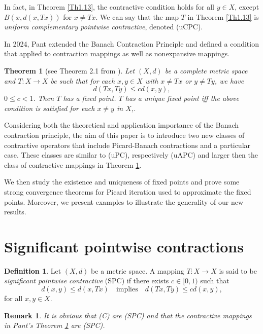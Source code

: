\documentclass[12 pt]{article}
\theoremstyle{lema}
\theoremstyle{proposition}
\theoremstyle{theorem}
\newtheorem{theorem}{Theorem}[section]
\theoremstyle{theorem}
\newtheorem{remark}{Remark}[section]
\theoremstyle{corollary}
\theoremstyle{definition}
\newtheorem{definition}{Definition}[section]
\theoremstyle{example}
\begin{document}
	In fact, in Theorem \ref{Th1.13}, the contractive condition holds for all $y \in X$, except $B(x, d(x,Tx))$ for $x \neq Tx$. We can say that the map $T$ in Theorem \ref{Th1.13} is \textit{uniform complementary pointwise contractive}, denoted (uCPC).
	
	In 2024, Pant \cite{Pant} extended the Banach Contraction Principle and defined a condition that applied to contraction mappings as well as nonexpansive mappings.
	
	\begin{theorem}[see Theorem 2.1 from \cite{Pant}]
		Let \((X,d)\) be a complete metric space and \(T : X \to X \) be such that for each \(x,y \in X\) with \(x \neq Tx\) or $y \neq Ty$, we have \[d(Tx,Ty) \leq c d(x,y),\] \(0\leq c <1\). Then \(T\) has a fixed point. \(T\) has a unique fixed point iff the above condition is satisfied for each $x \neq y$ in $X$,.
	\label{Th1.14}
	\end{theorem}

	Considering both the theoretical and application importance of the Banach contraction principle, the aim of this paper is to introduce two new classes of contractive operators that include Picard-Banach contractions and a particular case. These classes are similar to (uPC), respectively (uAPC) and larger then the class of contractive mappings in Theorem \ref{Th1.14}.
	
	We then study the existence and uniqueness of fixed points and prove some strong convergence theorems for Picard iteration used to approximate the fixed points. Moreover, we present examples to illustrate the generality of our new results.
	
	\section{Significant pointwise contractions}
	
	\begin{definition}
		Let \((X,d)\) be a metric space. A mapping \(T : X \to X \) is said to be \textit{significant pointwise contractive} (SPC) if  there exists \(c \in [0,1)\) such that 
		\begin{equation}
			d(x,y) \leq d(x,Tx) \quad \text{implies} \quad d(Tx,Ty) \leq c d(x,y), 
		\label{*}
		\end{equation}
		for all \(x,y \in X\).
	\end{definition}

	\begin{remark}
		It is obvious that (C) are (SPC) and that the contractive mappings in Pant's Theorem \ref{Th1.14} are (SPC).
	\end{remark}
\end{document}
